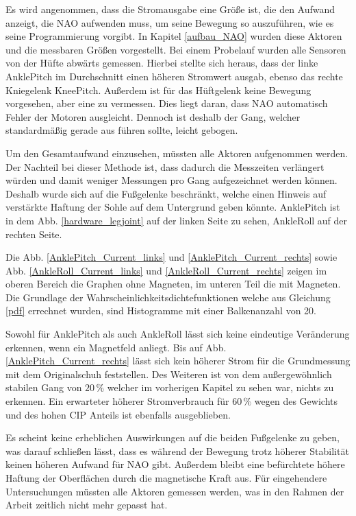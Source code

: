 Es wird angenommen, dass die Stromausgabe eine Größe ist, die den Aufwand anzeigt, die NAO aufwenden muss, um seine Bewegung so auszuführen, wie es seine Programmierung vorgibt. In Kapitel \ref{aufbau_NAO} wurden diese Aktoren und die messbaren Größen vorgestellt. Bei einem Probelauf wurden alle Sensoren von der Hüfte abwärts gemessen. Hierbei stellte sich heraus, dass der linke AnklePitch im Durchschnitt einen höheren Stromwert ausgab, ebenso das rechte Kniegelenk KneePitch. Außerdem ist für das Hüftgelenk keine Bewegung vorgesehen, aber eine zu vermessen. Dies liegt daran, dass NAO automatisch Fehler der Motoren ausgleicht. Dennoch ist deshalb der Gang, welcher standardmäßig gerade aus führen sollte, leicht gebogen. 

Um den Gesamtaufwand einzusehen, müssten alle Aktoren aufgenommen werden. Der Nachteil bei dieser Methode ist, dass dadurch die Messzeiten verlängert würden und damit weniger Messungen pro Gang aufgezeichnet werden können. Deshalb wurde sich auf die Fußgelenke beschränkt, welche einen Hinweis auf verstärkte Haftung der Sohle auf dem Untergrund geben könnte. AnklePitch ist in dem Abb. \ref{hardware_legjoint} auf der linken Seite zu sehen, AnkleRoll auf der rechten Seite. 

Die Abb. \ref{AnklePitch_Current_links} und \ref{AnklePitch_Current_rechts} sowie Abb. \ref{AnkleRoll_Current_links} und \ref{AnkleRoll_Current_rechts} zeigen im oberen Bereich die Graphen ohne Magneten, im unteren Teil die mit Magneten. Die Grundlage der Wahrscheinlichkeitsdichtefunktionen welche aus Gleichung \eqref{pdf} errechnet wurden, sind Histogramme mit einer Balkenanzahl von 20.

Sowohl für AnklePitch als auch AnkleRoll lässt sich keine eindeutige Veränderung erkennen, wenn ein Magnetfeld anliegt. Bis auf Abb. \ref{AnklePitch_Current_rechts} lässt sich kein höherer Strom für die Grundmessung mit dem Originalschuh feststellen. Des Weiteren ist von dem außergewöhnlich stabilen Gang von $20\,\%$ welcher im vorherigen Kapitel zu sehen war, nichts zu erkennen. Ein erwarteter höherer Stromverbrauch für $60\,\%$ wegen des Gewichts und des hohen CIP Anteils ist ebenfalls ausgeblieben. 

Es scheint keine erheblichen Auswirkungen auf die beiden Fußgelenke zu geben, was darauf schließen lässt, dass es während der Bewegung trotz höherer Stabilität keinen höheren Aufwand für NAO gibt. Außerdem bleibt eine befürchtete höhere Haftung der Oberflächen durch die magnetische Kraft aus. Für eingehendere Untersuchungen müssten alle Aktoren gemessen werden, was in den Rahmen der Arbeit zeitlich nicht mehr gepasst hat. 

